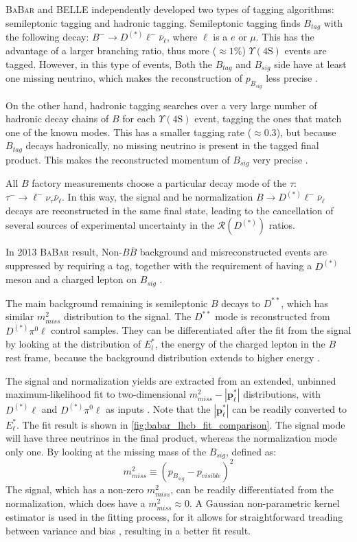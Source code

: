 \documentclass[12pt,letterpaper]{article}
\renewcommand{\vec}[1]{\mathbf{#1}}                   %
\def\BaBar/{\textsc{BaBar}}
\def\Y4S/{\ensuremath{\Upsilon(\text{4S})}}
\def\RDDst/{\ensuremath{\mathcal{R}(D^{(*)})}}
\begin{document}
\BaBar/ and BELLE independently developed two types of tagging algorithms:
semileptonic tagging and hadronic tagging.
Semileptonic tagging finds $B_{tag}$ with the following decay:
$B^- \rightarrow D^{(*)} \ell^- \bar{\nu}_\ell$, where $\ell$ is a $e$ or $\mu$.
This has the advantage of a larger branching ratio, thus more ($\approx 1\%$)
\Y4S/ events are tagged.
However, in this type of events, Both the $B_{tag}$ and $B_{sig}$ side have at least one missing neutrino, which
makes the reconstruction of $p_{B_{sig}}$ less precise \cite{Ciezarek:2017yzh}.

On the other hand, hadronic tagging searches over a very large number of
hadronic decay chains of $B$ for each \Y4S/ event, tagging the ones that match
one of the known modes.
This has a smaller tagging rate ($\approx 0.3$), but because $B_{tag}$ decays
hadronically, no missing neutrino is present in the tagged final product.
This makes the reconstructed momentum of $B_{sig}$ very
precise \cite{Lees:2013uzd,Ciezarek:2017yzh}.

All $B$ factory measurements choose a particular decay mode of the $\tau$:
$\tau^- \rightarrow \ell^- \nu_\tau \bar{\nu}_\ell$. In this way, the signal and
he normalization $B \rightarrow D^{(*)} \ell^- \overline{\nu}_\ell$ decays
are reconstructed in the same final state, leading to the cancellation of
several sources of experimental uncertainty in the \RDDst/ ratios.

In 2013 \BaBar/ result,
Non-$B \overline{B}$ background and misreconstructed events are suppressed by
requiring a tag, together with the requirement of having a $D^{(*)}$ meson and a
charged lepton on $B_{sig}$ \cite{Ciezarek:2017yzh}.

The main background remaining is semileptonic $B$ decays to $D^{**}$, which has
similar $m^2_{miss}$ distribution to the signal.
The $D^{**}$ mode is reconstructed from $D^{(*)}\pi^0\ell$ control samples.
They can be differentiated after the fit from the signal by looking at the distribution of
$E^{*}_l$, the energy of the charged lepton in the $B$ rest
frame, because the background distribution extends to higher
energy \cite{Ciezarek:2017yzh}.

The signal and normalization yields are extracted from an extended, unbinned maximum-likelihood fit to two-dimensional $m^2_{miss}-|\vec{p}^*_\ell|$ distributions, with $D^{(*)}\ell$ and $D^{(*)}\pi^0\ell$ as inputs \cite{Lees:2013uzd}.
Note that the $|\vec{p}^*_\ell|$ can be readily converted to $E^*_\ell$.
The fit result is shown in \autoref{fig:babar_lhcb_fit_comparison}.
The signal mode will have three neutrinos in the final product,
whereas the normalization mode only one.
By looking at the missing mass of the $B_{sig}$, defined as:
\begin{equation}
    m^2_{miss} \equiv \left(p_{B_{sig}} - p_{visible}\right)^2
\end{equation}
The signal, which has a non-zero $m^2_{miss}$, can be readily differentiated
from the normalization, which does have a $m^2_{miss} \approx 0$.
A Gaussian non-parametric kernel estimator is used in the
fitting process, for it allows for straightforward treading between variance
and bias \cite{Lees:2013uzd}, resulting in a better fit result.
\end{document}
